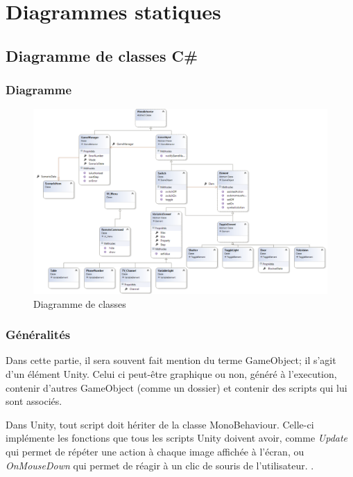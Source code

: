 \section{Diagrammes statiques}

\subsection{\label{modelisation}Diagramme de classes C\#}

\subsubsection{Diagramme}
\begin{figure}[h]
    \centering
    \includegraphics[width=\textwidth]{4-Conception/img/diagClasses.png}
    \caption{Diagramme de classes}
    \label{fig:class_diagram}
\end{figure}

\subsubsection{Généralités}
Dans cette partie, il sera souvent fait mention du terme GameObject; il s'agit d'un élément Unity. 
Celui ci peut-être graphique ou non, généré à l'execution, contenir d'autres GameObject (comme un dossier) et contenir des scripts qui lui sont associés.\newline

Dans Unity, tout script doit hériter de la classe MonoBehaviour. Celle-ci implémente les fonctions que tous les scripts Unity doivent avoir, comme \textit{Update} qui permet de répéter une action à chaque image affichée à l'écran, ou \textit{OnMouseDown} qui permet de réagir à un clic de souris de l'utilisateur. .\newline

